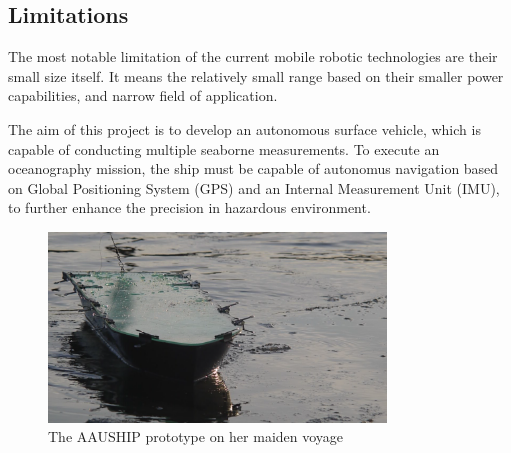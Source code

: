 \subsection{Limitations}

The most notable limitation of the current mobile robotic technologies are their small size itself. It means the relatively small range based on their smaller power capabilities, and narrow field of application.

The aim of this project is to develop an autonomous surface vehicle, which is capable of conducting multiple seaborne measurements. To execute an oceanography mission, the ship must be capable of autonomus navigation based on Global Positioning System (GPS) and an Internal Measurement Unit (IMU), to further enhance the precision in hazardous environment.

\begin{figure}[H]
	\centering
	\includegraphics[width=0.8\textwidth]{img/aauship}
	\caption{The AAUSHIP prototype on her maiden voyage}
	\label{fig:aauship}
\end{figure}

